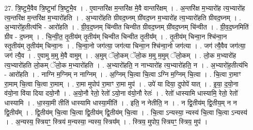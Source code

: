 \documentclass[17pt]{extarticle}
\begin{document}
27. त्रि॒ष्टुभै॒वैव त्रि॒ष्टुभा᳚ त्रि॒ष्टुभै॒व । . ए॒वान्तरि॑क्ष म॒न्तरि॑क्ष मे॒वै वान्तरि॑क्षम् । . अ॒न्तरि॑क्ष म॒भ्यारो॑ह त्य॒भ्यारो॑ह त्य॒न्तरि॑क्ष म॒न्तरि॑क्ष म॒भ्यारो॑हति । . अ॒भ्यारो॑हति ग्रीवद॒घ्नम् ग्री॑वद॒घ्न म॒भ्यारो॑ह त्य॒भ्यारो॑हति ग्रीवद॒घ्नम् । . अ॒भ्यारो॑ह॒तीत्य॑भि - आरो॑हति । . ग्री॒व॒द॒घ्नम् चि॑न्वीत चिन्वीत ग्रीवद॒घ्नम् ग्री॑वद॒घ्नम् चि॑न्वीत । . ग्री॒व॒द॒घ्नमिति॑ ग्रीव - द॒घ्नम् । . चि॒न्वी॒त॒ तृ॒तीय॑म् तृ॒तीय॑म् चिन्वीत चिन्वीत तृ॒तीय᳚म् । . तृ॒तीय॑म् चिन्वा॒न श्चि॑न्वा॒न स्तृ॒तीय॑म् तृ॒तीय॑म् चिन्वा॒नः । . चि॒न्वा॒नो जग॑त्या॒ जग॑त्या चिन्वा॒न श्चि॑न्वा॒नो जग॑त्या । . जग॑ त्यै॒वैव जग॑त्या॒ जग॑ त्यै॒व । . ए॒वामु म॒मु मे॒वै वामुम् । . अ॒मुम् ॅलो॒कम् ॅलो॒क म॒मु म॒मुम् ॅलो॒कम् । . लो॒क म॒भ्यारो॑ह त्य॒भ्यारो॑हति लो॒कम् ॅलो॒क म॒भ्यारो॑हति । . अ॒भ्यारो॑हति॒ न नाभ्यारो॑ह त्य॒भ्यारो॑हति॒ न । . अ॒भ्यारो॑ह॒तीत्य॑भि - आरो॑हति । . नाग्नि म॒ग्निम् न नाग्निम् । . अ॒ग्निम् चि॒त्वा चि॒त्वा ऽग्नि म॒ग्निम् चि॒त्वा । . चि॒त्वा रा॒माꣳ रा॒माम् चि॒त्वा चि॒त्वा रा॒माम् । . रा॒मा मुपोप॑ रा॒माꣳ रा॒मा मुप॑ । . उपे॑ या दिया॒ दुपोपे॑ यात् । . इ॒या॒ द॒यो॒ना व॑यो॒ना वि॑या दिया दयो॒नौ । . अ॒यो॒नौ रेतो॒ रेतो॑ ऽयो॒ना व॑यो॒नौ रेतः॑ । . रेतो॑ धास्यामि धास्यामि॒ रेतो॒ रेतो॑ धास्यामि । . धा॒स्या॒मी तीति॑ धास्यामि धास्या॒मीति॑ । . इति॒ न नेतीति॒ न । . न द्वि॒तीय॑म् द्वि॒तीय॒म् न न द्वि॒तीय᳚म् । . द्वि॒तीय॑म् चि॒त्वा चि॒त्वा द्वि॒तीय॑म् द्वि॒तीय॑म् चि॒त्वा । . चि॒त्वा ऽन्यस्या॒ न्यस्य॑ चि॒त्वा चि॒त्वा ऽन्यस्य॑ । . अ॒न्यस्य॒ स्त्रियꣳ॒॒ स्त्रिय॑ म॒न्यस्या॒ न्यस्य॒ स्त्रिय᳚म् । . स्त्रिय॒ मुपोप॒ स्त्रियꣳ॒॒ स्त्रिय॒ मुप॑ । \newline
\end{document}
